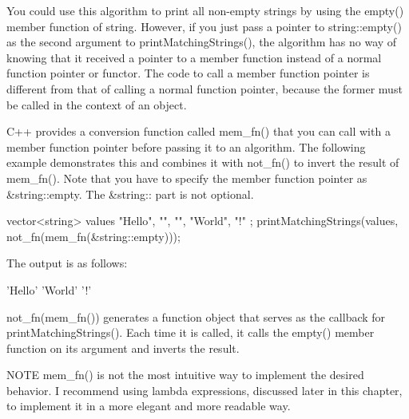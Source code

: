 You could use this algorithm to print all non-empty strings by using the empty() member function of string. However, if you just pass a pointer to string::empty() as the second argument to printMatchingStrings(), the algorithm has no way of knowing that it received a pointer to a member function instead of a normal function pointer or functor. The code to call a member function pointer is different from that of calling a normal function pointer, because the former must be called in the context of an object.

C++ provides a conversion function called mem\_fn() that you can call with a member function pointer before passing it to an algorithm. The following example demonstrates this and combines it with not\_fn() to invert the result of mem\_fn(). Note that you have to specify the member function pointer as \&string::empty. The \&string:: part is not optional.

\begin{cpp}
vector<string> values { "Hello", "", "", "World", "!" };
printMatchingStrings(values, not_fn(mem_fn(&string::empty)));
\end{cpp}

The output is as follows:

\begin{shell}
'Hello' 'World' '!'
\end{shell}

not\_fn(mem\_fn()) generates a function object that serves as the callback for printMatchingStrings(). Each time it is called, it calls the empty() member function on its argument and inverts the result.

\begin{myNotic}{NOTE}
mem\_fn() is not the most intuitive way to implement the desired behavior. I recommend using lambda expressions, discussed later in this chapter, to implement it in a more elegant and more readable way.
\end{myNotic}







